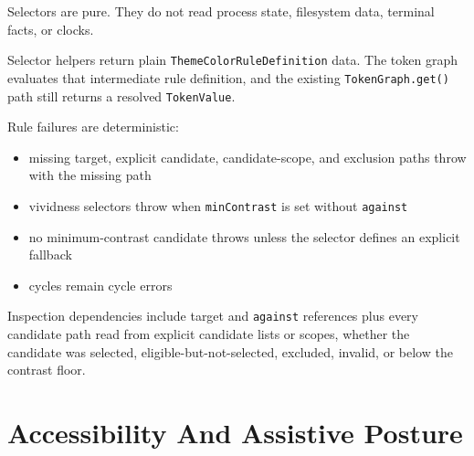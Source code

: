 Selectors are pure. They do not read process state, filesystem data, terminal facts, or clocks.

Selector helpers return plain \texttt{T\allowbreak{}h\allowbreak{}e\allowbreak{}m\allowbreak{}e\allowbreak{}C\allowbreak{}o\allowbreak{}l\allowbreak{}o\allowbreak{}r\allowbreak{}R\allowbreak{}u\allowbreak{}l\allowbreak{}e\allowbreak{}D\allowbreak{}e\allowbreak{}f\allowbreak{}i\allowbreak{}n\allowbreak{}i\allowbreak{}t\allowbreak{}i\allowbreak{}o\allowbreak{}n} data. The token graph evaluates that intermediate rule definition, and the existing \texttt{T\allowbreak{}o\allowbreak{}k\allowbreak{}e\allowbreak{}n\allowbreak{}G\allowbreak{}r\allowbreak{}a\allowbreak{}p\allowbreak{}h\allowbreak{}.\allowbreak{}g\allowbreak{}e\allowbreak{}t\allowbreak{}(\allowbreak{})} path still returns a resolved \texttt{T\allowbreak{}o\allowbreak{}k\allowbreak{}e\allowbreak{}n\allowbreak{}V\allowbreak{}a\allowbreak{}l\allowbreak{}u\allowbreak{}e}.

Rule failures are deterministic:

\begin{itemize}
\tightlist
\item
  missing target, explicit candidate, candidate-scope, and exclusion paths throw with the missing path
\item
  vividness selectors throw when \texttt{m\allowbreak{}i\allowbreak{}n\allowbreak{}C\allowbreak{}o\allowbreak{}n\allowbreak{}t\allowbreak{}r\allowbreak{}a\allowbreak{}s\allowbreak{}t} is set without \texttt{a\allowbreak{}g\allowbreak{}a\allowbreak{}i\allowbreak{}n\allowbreak{}s\allowbreak{}t}
\item
  no minimum-contrast candidate throws unless the selector defines an explicit fallback
\item
  cycles remain cycle errors
\end{itemize}

Inspection dependencies include target and \texttt{a\allowbreak{}g\allowbreak{}a\allowbreak{}i\allowbreak{}n\allowbreak{}s\allowbreak{}t} references plus every candidate path read from explicit candidate lists or scopes, whether the candidate was selected, eligible-but-not-selected, excluded, invalid, or below the contrast floor.

\section{Accessibility And Assistive Posture}\label{record-184-accessibility-and-assistive-posture}

